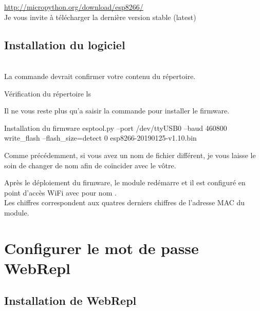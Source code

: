 \url{http://micropython.org/download/esp8266/}\\

Je vous invite à télécharger la dernière version stable (latest)


\section{Installation du logiciel}

 \\

La commande  devrait confirmer votre contenu du répertoire.

\begin{Bash}{Vérification du répertoire}
ls
\end{Bash}


Il ne vous reste plus qu'a saisir la commande pour installer le firmware. \\
\begin{Bash}{Installation du firmware}
esptool.py --port /dev/ttyUSB0 --baud 460800 write_flash --flash_size=detect 0 esp8266-20190125-v1.10.bin
\end{Bash}

Comme précédemment, si vous avez un nom de fichier différent, je vous laisse le soin de changer de nom afin de coïncider avec le vôtre.


Après le déploiement du firmware, le module redémarre et il est configuré en point d’accès WiFi avec pour nom . \\ Les chiffres correspondent aux quatres derniers chiffres de l'adresse MAC du module. 


\chapter{Configurer le mot de passe \\WebRepl}

\section{Installation de WebRepl}

